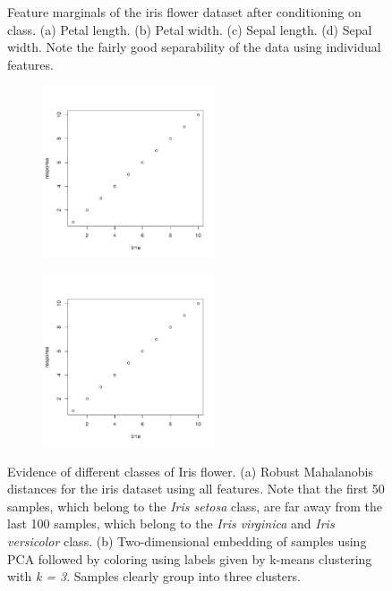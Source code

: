 \documentclass[12pt]{article}
\begin{document}
\begin{figure}[t]
\begin{subfigure}[b]{0.45\textwidth}
		\subcaption{}
	\end{subfigure}
	\caption{Feature marginals of the iris flower dataset after conditioning on class. (a) Petal length. (b) Petal width. (c) Sepal length. (d) Sepal width. Note the fairly good separability of the data using individual features.}
	\label{fig:IrisMarginals}
\end{figure}

\begin{figure}[t]
	\centering
	\begin{subfigure}[b]{0.45\textwidth}
		\includegraphics[width=\textwidth, height = 2in]{fig1.pdf}
		\subcaption{}
		\label{fig:IrisOutliers}
	\end{subfigure}	\hfill	
	\begin{subfigure}[b]{0.45\textwidth}
		\includegraphics[width=\textwidth, height = 2in]{fig1.pdf}
		\subcaption{}
		\label{fig:IrisEmbedding}
	\end{subfigure}
	\caption{Evidence of different classes of Iris flower. (a) Robust Mahalanobis distances for the iris dataset using all features. Note that the first 50 samples, which belong to the \textit{Iris setosa} class, are far away from the last 100 samples, which belong to the \textit{Iris virginica} and \textit{Iris versicolor} class. (b) Two-dimensional embedding of samples using PCA followed by coloring using labels given by k-means clustering with \textit{k = 3}. Samples clearly group into three clusters.}
\end{figure}
\end{document}
